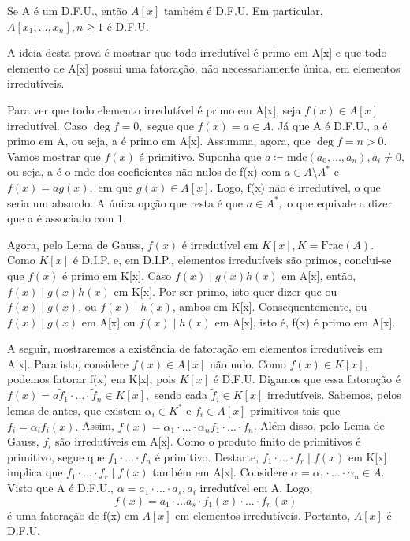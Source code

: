 \documentclass[AlgebraII/algebraII_notes.tex]{subfiles}
\begin{document}
\begin{theorem*}
	Se A é um D.F.U., então \(A[x]\) também é D.F.U. Em particular, \(A[x_{1}, \dotsc , x_{n}], n\geq 1\) é D.F.U.
\end{theorem*}
\begin{proof*}
	A ideia desta prova é mostrar que todo irredutível é primo em A[x] e que todo elemento de A[x] possui uma fatoração, não necessariamente
	única, em elementos irredutíveis.

	Para ver que todo elemento irredutível é primo em A[x], seja \(f(x)\in A[x]\) irredutível. Caso \(\deg{f} = 0,\) segue que \(f(x) = a\in A.\) Já
	que A é D.F.U., a é primo em A, ou seja, a é primo em A[x]. Assumma, agora, que \(\deg{f} = n > 0.\) Vamos mostrar que \(f(x)\) é primitivo. Suponha que
	\(a\coloneqq \mathrm{mdc}(a_{0}, \dotsc , a_{n}), a_{i}\neq 0\), ou seja, a é o mdc dos coeficientes não nulos de f(x) com \(a\in A\setminus{A^{*}} \) e
	\(f(x) = ag(x),\) em que \(g(x)\in A[x].\) Logo, f(x) não é irredutível, o que seria um absurdo. A única opção que resta é que \(a\in A^{*},\) o que equivale a dizer
	que a é associado com 1.

	Agora, pelo Lema de Gauss, \(f(x)\) é irredutível em \(K[x], K = \mathrm{Frac}(A).\) Como \(K[x]\) é D.I.P. e, em D.I.P., elementos irredutíveis são primos,
	conclui-se que \(f(x)\) é primo em K[x]. Caso \(f(x)\mid g(x)h(x)\) em A[x], então, \(f(x)\mid g(x)h(x)\) em K[x]. Por ser primo, isto quer dizer que ou
	\(f(x)\mid g(x)\), ou \(f(x)\mid h(x)\), ambos em K[x]. Consequentemente, ou \(f(x)\mid g(x)\) em A[x] ou \(f(x)\mid h(x)\) em A[x], isto é, f(x) é primo em A[x].

	A seguir, mostraremos a existência de fatoração em elementos irredutíveis em A[x]. Para isto, considere \(f(x)\in A[x]\) não nulo. Como \(f(x)\in K[x],\)
	podemos fatorar f(x) em K[x], pois \(K[x]\) é D.F.U. Digamos que essa fatoração é \(f(x) = a\tilde{f}_{1}\cdot \dotsc \cdot \tilde{f}_{n}\in K[x],\) sendo cada
	\(\tilde{f}_{i}\in K[x]\) irredutíveis. Sabemos, pelos lemas de antes, que existem \(\alpha_{i}\in K^{*}\) e \(f_{i}\in A[x]\) primitivos tais que \(\tilde{f}_{i} =
	\alpha_{i}f_{i}(x).\) Assim, \(f(x) = \alpha_{1}\cdot \dotsc \cdot \alpha_{n}f_{1}\cdot \dotsc \cdot f_{n}\). Além disso, pelo Lema de Gauss, \(f_{i}\) são irredutíveis
	em A[x]. Como o produto finito de primitivos é primitivo, segue que \(f_{1}\cdot \dotsc \cdot f_{n}\) é primitivo. Destarte, \(f_{1}\cdot \dotsc \cdot f_{r}\mid f(x)\)
	em K[x] implica que \(f_{1}\cdot \dotsc \cdot f_{r}\mid f(x)\) também em A[x]. Considere \(\alpha = \alpha _{1}\cdot \dotsc \cdot \alpha_{n}\in A.\) Visto que A é
	D.F.U., \(\alpha = a_{1}\cdot \dotsc \cdot a_{s}, a_{i}\) irredutível em A. Logo,
	\[
		f(x) = a_{1}\cdot \dotsc a_{s}\cdot f_{1}(x)\cdot \dotsc \cdot f_{n}(x)
	\]
	é uma fatoração de f(x) em \(A[x]\) em elementos irredutíveis. Portanto, \(A[x]\) é D.F.U. \qedsymbol
\end{proof*}
\end{document}
